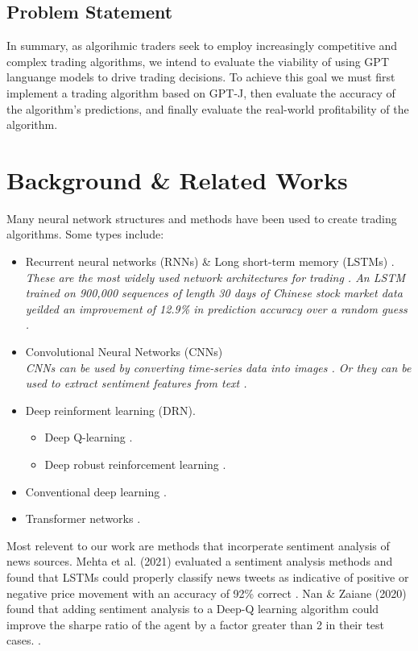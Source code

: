 \documentclass[conference]{IEEEtran}
\begin{document}
\subsection{Problem Statement}
In summary, as algorihmic traders seek to employ increasingly competitive and complex trading algorithms, we intend to evaluate the viability of using GPT languange models to drive trading decisions. To achieve this goal we must first implement a trading algorithm based on GPT-J, then evaluate the accuracy of the algorithm's predictions, and finally evaluate the real-world profitability of the algorithm.

\section{Background \& Related Works}
Many neural network structures and methods have been used to create trading algorithms. Some types include: 
\begin{itemize}
    \item Recurrent neural networks (RNNs) \& Long short-term memory (LSTMs) \cite{Chen2017}\cite{Mehta2021}.
    \\\emph{These are the most widely used network architectures for trading \cite{Gu2020}. An LSTM trained on 900,000 sequences of length 30 days of Chinese stock market data yeilded an improvement of 12.9\% in prediction accuracy over a random guess \cite{Chen2015}.}
    \item Convolutional Neural Networks (CNNs) \cite{Gu2020}
    \\\emph{CNNs can be used by converting time-series data into images \cite{Sezer2018}. Or they can be used to extract sentiment features from text \cite{Shi2020}.}
    \item Deep reinforment learning (DRN).
    \begin{itemize}
        \item Deep Q-learning \cite{Wang2017} \cite{Nan2020}.
        \item Deep robust reinforcement learning \cite{Li2019}.
    \end{itemize}
    \item Conventional deep learning \cite{Day2016}.
    \item Transformer networks \cite{Schmitz2020}.
\end{itemize}
Most relevent to our work are methods that incorperate sentiment analysis of news sources. Mehta et al. (2021) evaluated a sentiment analysis methods and found that LSTMs could properly classify news tweets as indicative of positive or negative price movement with an accuracy of 92\% correct \cite{Mehta2021}. Nan \& Zaiane (2020) found that adding sentiment analysis to a Deep-Q learning algorithm could improve the sharpe ratio of the agent by a factor greater than 2 in their test cases. \cite{Nan2020}.
\end{document}
